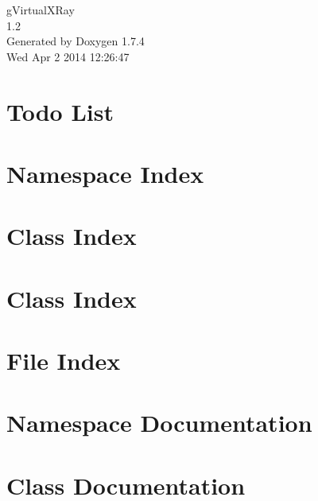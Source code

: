 \documentclass[a4paper]{book}
\begin{document}
\hypersetup{pageanchor=false}
\begin{titlepage}
\vspace*{7cm}
\begin{center}
{\Large gVirtualXRay \\[1ex]\large 1.2 }\\
\vspace*{1cm}
{\large Generated by Doxygen 1.7.4}\\
\vspace*{0.5cm}
{\small Wed Apr 2 2014 12:26:47}\\
\end{center}
\end{titlepage}
\clearemptydoublepage
{}
\tableofcontents
\clearemptydoublepage
{}
\hypersetup{pageanchor=true}
\chapter{Todo List}
\label{todo}
\hypertarget{todo}{}

\chapter{Namespace Index}

\chapter{Class Index}

\chapter{Class Index}

\chapter{File Index}

\chapter{Namespace Documentation}




\chapter{Class Documentation}























\end{document}
